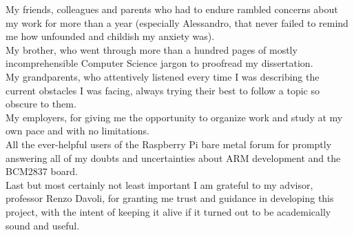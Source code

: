\documentclass[12pt,a4paper,openright,twoside]{report}
\begin{document}
My friends, colleagues and parents who had to endure rambled concerns about
my work for more than a year (especially Alessandro, that never failed 
to remind me how unfounded and childish my anxiety was).\\

My brother, who went through more than a hundred pages of mostly incomprehensible
Computer Science jargon to proofread my dissertation.\\

My grandparents, who attentively listened every time I was describing the current
obstacles I was facing, always trying their best to follow a topic
so obscure to them.\\

My employers, for giving me the opportunity to organize work and study at my own
pace and with no limitations.\\

All the ever-helpful users of the Raspberry Pi bare metal forum for promptly 
answering all of my doubts and uncertainties about ARM development and the 
BCM2837 board.\\

Last but most certainly not least important I am grateful to my advisor, professor
Renzo Davoli, for granting me trust and guidance in developing this project, with
the intent of keeping it alive if it turned out to be academically sound and
useful.
\end{document}
